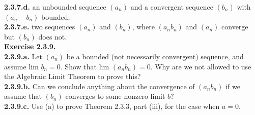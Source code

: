 \documentclass[12pt,letterpaper]{article}
\begin{document}
\textbf{2.3.7.d.} an unbounded sequence \((a_{n})\) and a convergent sequence \((b_{n})\) with \((a_{n} - b_{n})\) bounded; \\



\textbf{2.3.7.e.} two sequences \((a_{n})\) and \((b_{n})\), where \((a_{n}b_{n})\) and \((a_{n})\) converge but \((b_{n})\) does not. \\



\textbf{Exercise 2.3.9.} \\

\textbf{2.3.9.a.} Let \((a_{n})\) be a bounded (not necessarily convergent) sequence, and assume \(\text{lim } b_{n} = 0\). Show that \(\text{lim }(a_{n}b_{n}) = 0.\) Why are we not allowed to use the Algebraic Limit Theorem to prove this? \\



\textbf{2.3.9.b.} Can we conclude anything about the convergence of \((a_{n}b_{n})\) if we assume that \((b_{n})\) converges to some nonzero limit \(b\)? \\



\textbf{2.3.9.c.} Use (a) to prove Theorem 2.3.3, part (iii), for the case when \(a = 0\). \\
\end{document}
